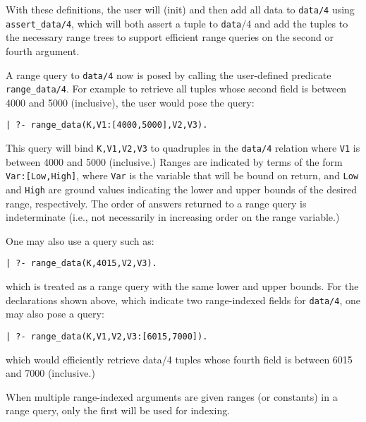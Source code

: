 With these definitions, the user will (init) and then add all data to
{\tt data/4} using {\tt assert\_data/4}, which will both assert a
tuple to {\tt data}/4 and add the tuples to the necessary range trees
to support efficient range queries on the second or fourth argument.

A range query to {\tt data/4} now is posed by calling the
user-defined predicate {\tt range\_data/4}.  For example to retrieve
all tuples whose second field is between 4000 and 5000 (inclusive),
the user would pose the query:

\begin{verbatim}
| ?- range_data(K,V1:[4000,5000],V2,V3).
\end{verbatim}

 This query will bind {\tt K,V1,V2,V3} to quadruples in the
{\tt data/4} relation where {\tt V1} is between 4000 and 5000
(inclusive.)  Ranges are indicated by terms of the form
{\tt Var:[Low,High]}, where {\tt Var} is the variable that will be
bound on return, and {\tt Low} and {\tt High} are ground values
indicating the lower and upper bounds of the desired range,
respectively.  The order of answers returned to a range query is
indeterminate (i.e., not necessarily in increasing order on the range
variable.)

One may also use a query such as:
\begin{verbatim}
| ?- range_data(K,4015,V2,V3).
\end{verbatim}
\noindent
which is treated as a range query with the same lower and upper
bounds.  For the declarations shown above, which indicate two
range-indexed fields for {\tt data/4}, one may also pose a query:

\begin{verbatim} 
| ?- range_data(K,V1,V2,V3:[6015,7000]).  
\end{verbatim} 

\noindent
 which would efficiently retrieve data/4 tuples whose fourth
field is between 6015 and 7000 (inclusive.)

When multiple range-indexed arguments are given ranges (or constants)
in a range query, only the first will be used for indexing.



